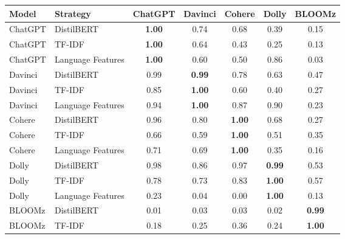 \begin{table}[ht]
    \vspace{0.1cm}
    \centering
    \begin{tabular}{llccccc}
        \toprule
        Model   & Strategy           & ChatGPT       & Davinci       & Cohere        & Dolly         & BLOOMz        \\
        \midrule
        ChatGPT & DistilBERT         & \textbf{1.00} & 0.74          & 0.68          & 0.39          & 0.15          \\
        ChatGPT & TF-IDF             & \textbf{1.00} & 0.64          & 0.43          & 0.25          & 0.13          \\
        ChatGPT & Language Features  & \textbf{1.00} & 0.60          & 0.50          & 0.86          & 0.03          \\
        Davinci & DistilBERT         & 0.99          & \textbf{0.99} & 0.78          & 0.63          & 0.47          \\
        Davinci & TF-IDF             & 0.85          & \textbf{1.00} & 0.60          & 0.40          & 0.27          \\
        Davinci & Language Features  & 0.94          & \textbf{1.00} & 0.87          & 0.90          & 0.23          \\
        Cohere  & DistilBERT         & 0.96          & 0.80          & \textbf{1.00} & 0.68          & 0.27          \\
        Cohere  & TF-IDF             & 0.66          & 0.59          & \textbf{1.00} & 0.51          & 0.35          \\
        Cohere  & Language Features  & 0.71          & 0.69          & \textbf{1.00} & 0.35          & 0.16          \\
        Dolly   & DistilBERT         & 0.98          & 0.86          & 0.97          & \textbf{0.99} & 0.53          \\
        Dolly   & TF-IDF             & 0.78          & 0.73          & 0.83          & \textbf{1.00} & 0.57          \\
        Dolly   & Language Features  & 0.23          & 0.04          & 0.00          & \textbf{1.00} & 0.13          \\
        BLOOMz  & DistilBERT         & 0.01          & 0.03          & 0.03          & 0.02          & \textbf{0.99} \\
        BLOOMz  & TF-IDF             & 0.18          & 0.25          & 0.36          & 0.24          & \textbf{1.00} \\

\end{tabular}
\end{table}
